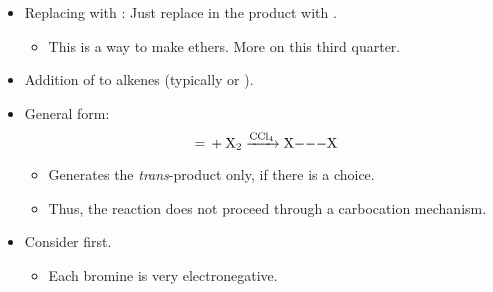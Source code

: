 \documentclass[../notes.tex]{subfiles}
\begin{document}
\begin{itemize}
\begin{figure}[H]
\begin{subfigure}[b]{\linewidth}
                [,0]\+{,,-1em}
                \arrow{<->>}
            \schemestop
            \caption{Third step.}
            \label{fig:acidCatalyzedHydrationd}
        \end{subfigure}
        \caption{Acid-catalyzed hydration mechanism.}
        \label{fig:acidCatalyzedHydration}
    \end{figure}
    \begin{itemize}
        \item Thus, the hydronium ion is a catalyst.
        \item Same regioselectivity --- this is Markovnikov addition.
        \item Same possibility for 1,2-shifts.
        \item Racemic mixture of product since the carbocation is $sp^2$ planar and water has equal probability of attacking both faces.
    \end{itemize}
    \item Replacing  with : Just replace  in the product with .
    \begin{itemize}
        \item This is a way to make ethers. More on this third quarter.
    \end{itemize}
    \item Addition of  to alkenes (typically  or ).
    \item General form:
    \begin{equation*}
        \ce{= + X2 ->[CCl4] X---X}
    \end{equation*}
    \begin{itemize}
        \item Generates the \emph{trans}-product only, if there is a choice.
        \item Thus, the reaction does not proceed through a carbocation mechanism.
    \end{itemize}
    \item Consider  first.
    \begin{itemize}
        \item Each bromine is very electronegative.

\end{itemize}
\end{itemize}
\end{document}
